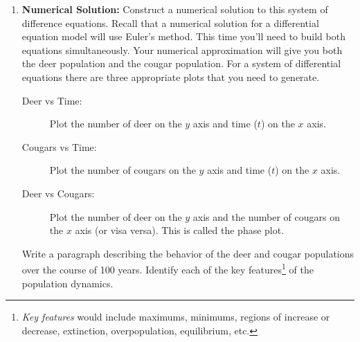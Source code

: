 \begin{problem}
\begin{enumerate}
    \item {\bf Numerical Solution:}  Construct a numerical solution to this system of
        difference equations.  Recall that a numerical solution for a differential
        equation model will use Euler's method.  This time you'll need to build both
        equations simultaneously.  Your numerical approximation will give you both the
        deer population and the cougar population.
        For a system of differential equations there are three appropriate plots that you
        need to generate.
        \begin{description}
            \item[Deer vs Time:] Plot the number of deer on the $y$ axis and time ($t$) on the
                $x$ axis.
            \item[Cougars vs Time:] Plot the number of cougars on the $y$ axis and time ($t$) on the
                $x$ axis.
            \item[Deer vs Cougars:] Plot the number of deer on the $y$ axis and the number
                of cougars on the $x$ axis (or visa versa).  This is called the phase
                plot.
        \end{description}
        Write a paragraph describing the behavior of the deer and cougar populations over
        the course of 100 years. Identify each of the key features\footnote{{\it Key
        features} would include maximums, minimums, regions of increase or decrease,
    extinction, overpopulation, equilibrium, etc.} of the population dynamics.


\end{enumerate}
\end{problem}
